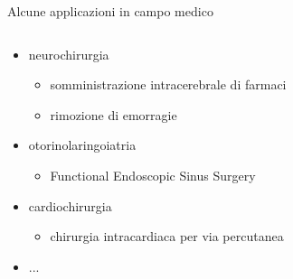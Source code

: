 
\begin{frame}{Alcune applicazioni in campo medico}
\begin{columns}
\begin{column}{0.5\textwidth}
\begin{itemize}
    \item<1-> neurochirurgia
    \begin{itemize}
        \item<2-> somministrazione intracerebrale di farmaci
        \item<3-> rimozione di emorragie
    \end{itemize}
    \item<4-> otorinolaringoiatria
    \begin{itemize}
        \item<5-> Functional Endoscopic Sinus Surgery
    \end{itemize}
    \item<6-> cardiochirurgia
    \begin{itemize}
        \item<6-> chirurgia intracardiaca per via percutanea
    \end{itemize}
    \item<7-> ...
\end{itemize}
\end{column}
\begin{column}{0.8\textwidth}

\end{column}
\end{columns}
\end{frame}
